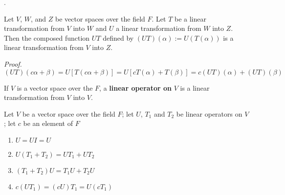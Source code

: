 \documentclass[8pt]{beamer}
\newcommand{\tb}[1]{\textbf{#1}}
\newcommand{\ti}[1]{\textit{#1}}
\begin{document}
\begin{frame}{.}
    \begin{theorem}
        Let $V$, $W$, and $Z$ be vector spaces over the field $F$. Let $T$ be a linear transformation from $V$ into $W$ and $U$ a linear transformation from $W$ into $Z$. Then the composed function $UT$ defined by $(UT)(\alpha) := U(T(\alpha))$ is a linear transformation from $V$ into $Z$.

        \ti{Proof.}
        \[
            (UT) (c\alpha + \beta) = U [T (c \alpha + \beta)] = U[cT(\alpha) + T(\beta)] = c(UT)(\alpha) + (UT)(\beta)
        \] 
    \end{theorem}

    \begin{definition}
        If $V$ is a vector space over the $F$, a \tb{linear operator on} $V$ is a linear transformation from $V$ into $V$.
    \end{definition}

    Let $V$ be a vector space over the field $F$; let $U$, $T_1$ and $T_2$ be linear operators on $V$; let $c$ be an element of $F$
    \begin{enumerate}
        \item $U = UI = U$
        \item $U(T_1+T_2) = UT_1 +UT_2$
        \item $(T_1 + T_2)U = T_1U + T_2U$
        \item $c(UT_1) = (cU)T_1 = U(cT_1)$
    \end{enumerate}
\end{frame}
\end{document}
